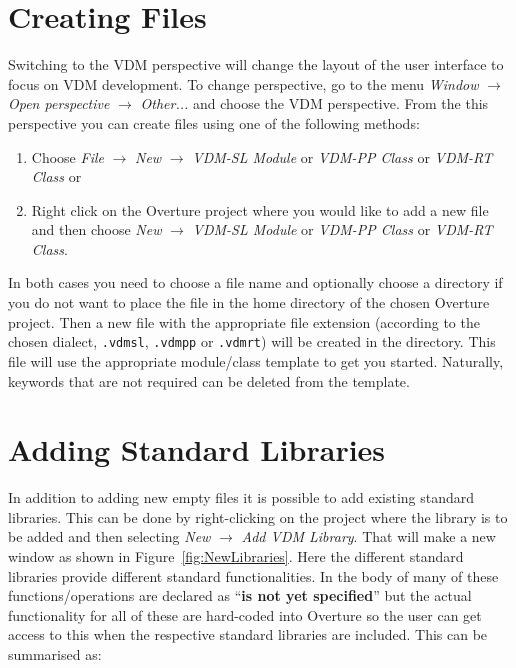\documentclass{overturerepchap}
\begin{document}

\section{Creating Files}

Switching to the VDM perspective will change the layout of the user
interface to focus on VDM development. To change perspective, go to the menu 
\emph{Window} $\rightarrow$ \emph{Open perspective} $\rightarrow$
\emph{Other...} and choose the VDM perspective.
From the this perspective you can create files
using one of the following methods:

\begin{enumerate}
  \item Choose \emph{File} $\rightarrow$ \emph{New} $\rightarrow$
    \emph{VDM-SL Module} or 
    \emph{VDM-PP Class} or 
    \emph{VDM-RT Class} or
  \item Right click on the Overture project where you would like to
    add a new file and then choose \emph{New} $\rightarrow$ 
    \emph{VDM-SL Module} or \emph{VDM-PP Class} or \emph{VDM-RT Class}.
\end{enumerate}

In both cases you need to choose a file name and optionally choose a
directory if you do not want to place the file in the home directory of
the chosen Overture project. Then a new file with the appropriate file
extension (according to the chosen dialect, \texttt{.vdmsl},
\texttt{.vdmpp} or \texttt{.vdmrt}) will be
created in the directory. This file will use the appropriate
module/class template to get you started. Naturally, keywords 
that are not required can be deleted from the template.

\section{Adding Standard Libraries}

In addition to adding new empty files it is possible to add existing
standard libraries. This can be done by right-clicking on the project
where the library is to be added and then selecting \emph{New} $\rightarrow$
    \emph{Add VDM Library}. That will make a new window as shown in
    Figure~\ref{fig:NewLibraries}. Here the different standard
    libraries provide different standard functionalities. In the body
    of many of these functions/operations are declared as
    ``{\textbf{\ttfamily is not yet specified}}'' but the actual
    functionality for all of these are hard-coded into Overture so the
    user can get access to this when the respective standard libraries
    are included. This can be
    summarised as:
\end{document}
